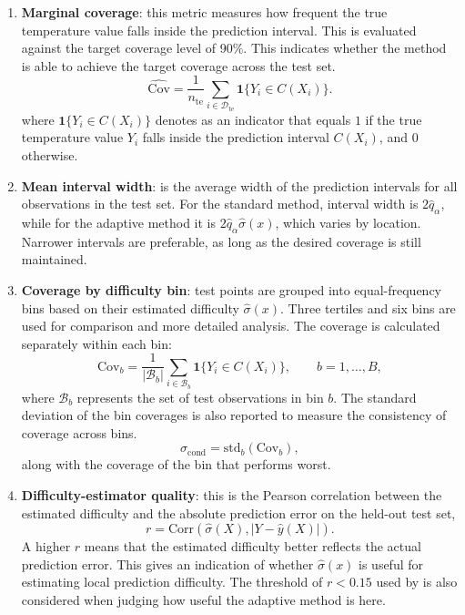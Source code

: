 \begin{enumerate}
\item \textbf{Marginal coverage}: this metric measures how frequent the true temperature value falls inside the prediction interval. This is evaluated against the target coverage level of 90\%. This indicates whether the method is able to achieve the target coverage across the test set.
\begin{equation}
\widehat{\mathrm{Cov}}
=
\frac{1}{n_{\mathrm{te}}}
\sum_{i\in\mathcal{D}_{\mathrm{te}}}
\mathbf{1}\{Y_i\in C(X_i)\}.
\end{equation}
where $\mathbf{1}\{Y_i\in C(X_i)\}$ denotes as an indicator that equals $1$ if the true temperature value $Y_i$ falls inside the prediction interval $C(X_i)$, and $0$ otherwise.

\item \textbf{Mean interval width}: is the average width of the prediction intervals for all observations in the test set. For the standard method, interval width is $2\hat q_\alpha$, while for the adaptive method it is $2\hat q_\alpha\hat\sigma(x)$, which varies by location. Narrower intervals are preferable, as long as the desired coverage is still maintained.

\item \textbf{Coverage by difficulty bin}: test points are grouped into equal-frequency bins based on their estimated difficulty $\hat\sigma(x)$. Three tertiles and six bins are used for comparison and more detailed analysis. The coverage is calculated separately within each bin:
\begin{equation}
    \mathrm{Cov}_b
    =
    \frac{1}{|\mathcal{B}_b|}
    \sum_{i\in\mathcal{B}_b}
    \mathbf{1}\{Y_i\in C(X_i)\},
    \qquad b=1,\ldots,B,
\end{equation}
where $\mathcal{B}_b$ represents the set of test observations in bin $b$. The standard deviation of the bin coverages is also reported to measure the consistency of coverage across bins.
\begin{equation}
    \sigma_{\mathrm{cond}}
    =
    \mathrm{std}_b(\mathrm{Cov}_b),
\end{equation}
along with the coverage of the bin that performs worst.

\item \textbf{Difficulty-estimator quality}: this is the Pearson correlation between the estimated difficulty and the absolute prediction error on the held-out test set,
\begin{equation}
    r=
    \mathrm{Corr}
    \left(
    \hat\sigma(X),
    |Y-\hat y(X)|
    \right).
\end{equation}
A higher $r$ means that the estimated difficulty better reflects the actual prediction error. This gives an indication of whether $\hat\sigma(x)$ is useful for estimating local prediction difficulty. The threshold of $r<0.15$ used by \citet{amirishahbazi2026} is also considered when judging how useful the adaptive method is here. 
\end{enumerate}

